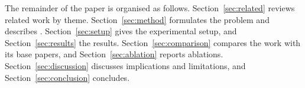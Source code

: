 The remainder of the paper is organised as follows.
Section~\ref{sec:related} reviews related work by theme. Section~\ref{sec:method}
formulates the problem and describes \idm{}. Section~\ref{sec:setup} gives the
experimental setup, and Section~\ref{sec:results} the results. Section~\ref{sec:comparison}
compares the work with its base papers, and Section~\ref{sec:ablation} reports
ablations. Section~\ref{sec:discussion} discusses implications and limitations, and
Section~\ref{sec:conclusion} concludes.

